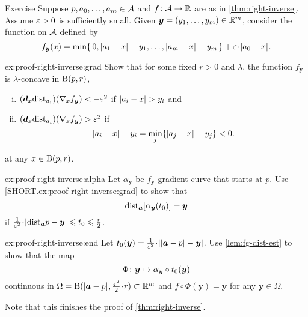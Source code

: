 \begin{thm}{Exercise}\label{ex:proof-right-inverse}
Suppose $p,a_0,\dots,a_m\in\mathcal{A}$ and $f\colon\mathcal{A}\to\mathbb{R}$ are as in \ref{thm:right-inverse}.
Assume $\varepsilon>0$ is sufficiently small.
Given $\bm{y}=(y_1,\dots,y_m)\in \mathbb{R}^m$, 
consider the function on $\mathcal{A}$ defined by
\[f_{\bm{y}}(x)=\min\{\,0, \dist{a_1}{x}{}-y_1,\dots,\dist{a_m}{x}{}-y_m\,\}+\eps\cdot\dist{a_0}{x}{}.\]


\begin{subthm}{ex:proof-right-inverse:grad}
Show that for some fixed $r>0$ and $\lambda$, the function $f_{\bm{y}}$ is $\lambda$-concave in $\mathrm{B}{}(p,r)$,
\begin{enumerate}[(i)]
\item\label{111} $(\bm{d}_x\mathrm{dist}_{a_i})(\nabla_x f_{\bm{y}})<-\varepsilon^2$ if $|{a_i}-{x}|_{}^{{}}>y_i$ and
\item\label{222} $(\bm{d}_x\mathrm{dist}_{a_i})(\nabla_x f_{\bm{y}})>\varepsilon^2$ if 
\[|{a_i}-{x}|_{}^{{}}-y_i=\min_j\{|{a_j}-{x}|_{}^{{}}-y_j\}<0.\]
\end{enumerate}
at any $x\in \mathrm{B}{}(p,r)$.

\end{subthm}

\begin{subthm}{ex:proof-right-inverse:alpha}
Let $\alpha_{\bm{y}}$ be $f_{\bm{y}}$-gradient curve that starts at $p$.
Use \ref{SHORT.ex:proof-right-inverse:grad} to show that 
\[
\mathrm{dist}_{\bm{a}}{[\alpha_{\bm{y}}(t_0)]}
= 
\bm{y}\]
if 
$\tfrac1{\eps^2}\cdot|\distfun_{\bm{a}}{p}-\bm{y}|
\le
t_0
\le
\tfrac{r}{2}$.

\end{subthm}

\begin{subthm}{ex:proof-right-inverse:end}
Let $t_0(\bm{y})=\tfrac{1}{\eps^2}\cdot|\dist{\bm{a}}{p}{}-\bm{y}|$.
Use \ref{lem:fg-dist-est} to show that the map
\[\Phi\colon{\bm{y}}\mapsto \alpha_{\bm{y}}\circ t_0(\bm{y})\]
continuous in $\Omega=\oBall(\dist{\bm{a}}{p}{},\tfrac{\eps^2}{2}\cdot r )\subset\RR^m$
and $f\circ \Phi(\bm{y})=\bm{y}$ for any $\bm{y}\in \Omega$.
\end{subthm}

Note that this finishes the proof of \ref{thm:right-inverse}.
\end{thm}


